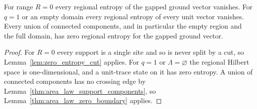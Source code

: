 \begin{lemma}
    \label{thm:area_law_degenerate_cases}
    \leanok
    For range $R=0$ every regional entropy of the gapped ground vector vanishes.
    For $q=1$ or an empty domain every regional entropy of every unit vector
    vanishes. Every union of connected components, and in particular the empty
    region and the full domain, has zero regional entropy for the gapped ground
    vector.
\end{lemma}

\begin{proof}\leanok
    For $R=0$ every support is a single site and so is never split by a cut,
    so Lemma~\ref{lem:zero_entropy_cut} applies.
    For $q=1$ or $\Lambda=\varnothing$ the regional Hilbert space is
    one-dimensional, and a unit-trace state on it has zero entropy. A union of
    connected components has no crossing edge by
    Lemma~\ref{thm:area_law_support_components}, so
    Lemma~\ref{thm:area_law_zero_boundary} applies.
\end{proof}
